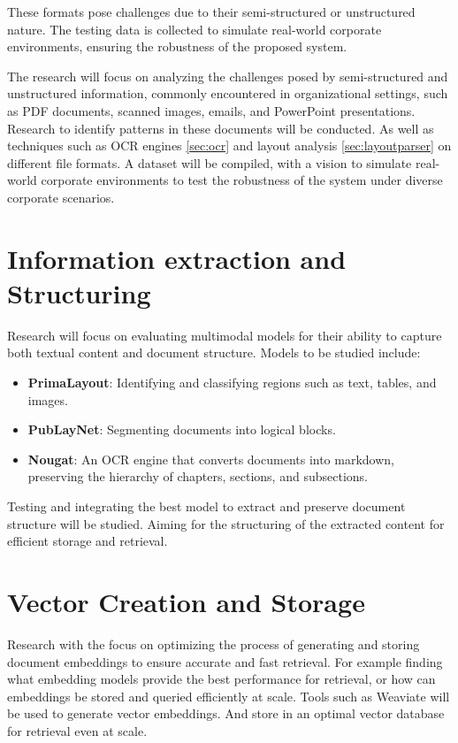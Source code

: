 These formats pose challenges due to their semi-structured or unstructured nature. The testing data is collected to simulate real-world corporate environments, ensuring the robustness of the proposed system.

The research will focus on analyzing the challenges posed by semi-structured and unstructured information, commonly encountered in organizational settings, such as PDF documents, scanned images, emails, and PowerPoint presentations.  Research to identify patterns in these documents will be conducted. As well as techniques such as OCR engines \ref{sec:ocr} and layout analysis \ref{sec:layoutparser} on different file formats.
A dataset will be compiled, with a vision to simulate real-world corporate environments to test the robustness of the system under diverse corporate scenarios.

\section{Information extraction and Structuring}
Research will focus on evaluating multimodal models for their ability to capture both textual content and document structure. Models to be studied include:
\begin{itemize}
    \item \textbf{PrimaLayout}: Identifying and classifying regions such as text, tables, and images.
    \item \textbf{PubLayNet}: Segmenting documents into logical blocks.
    \item \textbf{Nougat}: An OCR engine that converts documents into markdown, preserving the hierarchy of chapters, sections, and subsections.
    
\end{itemize}
Testing and integrating the best model to extract and preserve document structure will be studied. Aiming for the structuring of the extracted content for efficient storage and retrieval.
\section{Vector Creation and Storage}
Research with the focus on optimizing the process of generating and storing document embeddings to ensure accurate and fast retrieval. For example finding what embedding models provide the best performance for retrieval, or how can embeddings be stored and queried efficiently at scale.
Tools such as Weaviate will be used to generate vector embeddings. And store in an optimal vector database for retrieval even at scale.

